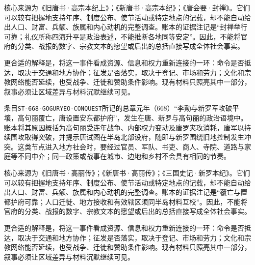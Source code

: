 核心来源为《旧唐书·高宗本纪上》；《新唐书·高宗本纪》；《唐会要·封禅》。它们可以较有把握地支持年序、制度公布、使节活动或特定地点的记载，却不能自动给出人口、财富、兵额、族属和内心动机的完整调查。账本的证据注记是“封禅举行可靠；礼仪所称四海升平是政治表述，不能推断各地同等安定”。因此，不能将官府的分类、战报的数字、宗教文本的愿望或后出的总括直接写成全体社会事实。

更合适的解释是，将这一事件看成资源、信息和权力重新连接的一环：命令是否抵达，取决于交通和地方协作；征发是否落实，取决于登记、市场和劳力；文化和宗教网络能否延续，也受战争、迁徙和赞助条件影响。现有材料只照亮其中一部分，叙事必须让区域差异与材料沉默继续可见。


条目\texttt{ST-668-GOGURYEO-CONQUEST}所记的总章元年（668）“李勣与新罗军攻破平壤，高句丽覆亡，唐设置安东都护府”，发生在唐、新罗与高句丽的政治语境中。账本将其原因概括为高句丽受连年战争、内部权力变动及唐罗夹攻消耗，唐军以持续围攻取得突破，并提示唐试图在半岛北部设府，随即与新罗围绕旧地控制发生冲突。这类节点进入地方社会时，要经过官员、军队、书吏、商人、寺院、道路与家庭等不同中介；同一政策或战事在城市、边地和乡村不会具有相同的节奏。

核心来源为《旧唐书·高丽传》；《新唐书·高丽传》；《三国史记·新罗本纪》。它们可以较有把握地支持年序、制度公布、使节活动或特定地点的记载，却不能自动给出人口、财富、兵额、族属和内心动机的完整调查。账本的证据注记是“覆亡与置都护府可靠；人口迁徙、地方接收和有效辖区须同半岛材料互校”。因此，不能将官府的分类、战报的数字、宗教文本的愿望或后出的总括直接写成全体社会事实。

更合适的解释是，将这一事件看成资源、信息和权力重新连接的一环：命令是否抵达，取决于交通和地方协作；征发是否落实，取决于登记、市场和劳力；文化和宗教网络能否延续，也受战争、迁徙和赞助条件影响。现有材料只照亮其中一部分，叙事必须让区域差异与材料沉默继续可见。
